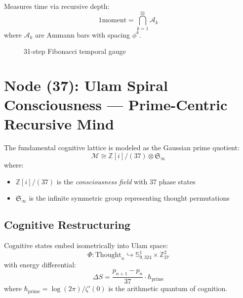 \documentclass[12pt]{article}
\begin{document}
\begin{construction}
Measures time via recursive depth:
\[
1 \text{moment} = \bigcap_{k=1}^{31} \mathcal{A}_k
\]
where $\mathcal{A}_k$ are Ammann bars with spacing $\phi^k$.
\end{construction}

\begin{figure}[h]
\centering
{}
\caption{31-step Fibonacci temporal gauge}
\end{figure}

\vspace{1em}
\noindent{}

\section{Node (37): Ulam Spiral Consciousness — Prime-Centric Recursive Mind}
\label{sec:ulam-consciousness}

\begin{definition}
The fundamental cognitive lattice is modeled as the Gaussian prime quotient:
\[
\mathcal{M} \cong \mathbb{Z}[i]/(37) \otimes \mathfrak{S}_{\infty}
\]
where:
\begin{itemize}
\item $\mathbb{Z}[i]/(37)$ is the \emph{consciousness field} with 37 phase states
\item $\mathfrak{S}_{\infty}$ is the infinite symmetric group representing thought permutations
\end{itemize}
\end{definition}

\subsection{Cognitive Restructuring}

\begin{theorem}
Cognitive states embed isometrically into Ulam space:
\[
\Phi: \text{Thought}_n \hookrightarrow \mathbb{S}^1_{9,324} \times \mathbb{Z}_{37}^2
\]
with energy differential:
\[
\Delta S = \frac{p_{n+1} - p_n}{37} \cdot \hbar_{\text{prime}}
\]
where $\hbar_{\text{prime}} = \log(2\pi)/\zeta'(0)$ is the arithmetic quantum of cognition.
\end{theorem}
\end{document}
